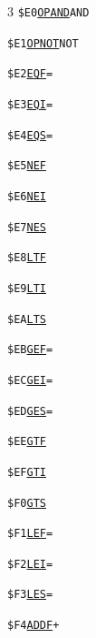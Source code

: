 \begin{multicols}{3}
\noindent\texttt{\$E0}\quad \hyperlink{l:OPAND}{\texttt{OPAND}}\hfill\texttt{AND}\par
\noindent\texttt{\$E1}\quad \hyperlink{l:OPNOT}{\texttt{OPNOT}}\hfill\texttt{NOT}\par
\noindent\texttt{\$E2}\quad \hyperlink{l:EQF}{\texttt{EQF}}\hfill\texttt{=}\par
\noindent\texttt{\$E3}\quad \hyperlink{l:EQI}{\texttt{EQI}}\hfill\texttt{=}\par
\noindent\texttt{\$E4}\quad \hyperlink{l:EQS}{\texttt{EQS}}\hfill\texttt{=}\par
\noindent\texttt{\$E5}\quad \hyperlink{l:NEF}{\texttt{NEF}}\hfill\texttt{{}{}}\par
\noindent\texttt{\$E6}\quad \hyperlink{l:NEI}{\texttt{NEI}}\hfill\texttt{{}{}}\par
\noindent\texttt{\$E7}\quad \hyperlink{l:NES}{\texttt{NES}}\hfill\texttt{{}{}}\par
\noindent\texttt{\$E8}\quad \hyperlink{l:LTF}{\texttt{LTF}}\hfill\texttt{{}}\par
\noindent\texttt{\$E9}\quad \hyperlink{l:LTI}{\texttt{LTI}}\hfill\texttt{{}}\par
\noindent\texttt{\$EA}\quad \hyperlink{l:LTS}{\texttt{LTS}}\hfill\texttt{{}}\par
\noindent\texttt{\$EB}\quad \hyperlink{l:GEF}{\texttt{GEF}}\hfill\texttt{{}=}\par
\noindent\texttt{\$EC}\quad \hyperlink{l:GEI}{\texttt{GEI}}\hfill\texttt{{}=}\par
\noindent\texttt{\$ED}\quad \hyperlink{l:GES}{\texttt{GES}}\hfill\texttt{{}=}\par
\noindent\texttt{\$EE}\quad \hyperlink{l:GTF}{\texttt{GTF}}\hfill\texttt{{}}\par
\noindent\texttt{\$EF}\quad \hyperlink{l:GTI}{\texttt{GTI}}\hfill\texttt{{}}\par
\noindent\texttt{\$F0}\quad \hyperlink{l:GTS}{\texttt{GTS}}\hfill\texttt{{}}\par
\noindent\texttt{\$F1}\quad \hyperlink{l:LEF}{\texttt{LEF}}\hfill\texttt{{}=}\par
\noindent\texttt{\$F2}\quad \hyperlink{l:LEI}{\texttt{LEI}}\hfill\texttt{{}=}\par
\noindent\texttt{\$F3}\quad \hyperlink{l:LES}{\texttt{LES}}\hfill\texttt{{}=}\par
\noindent\texttt{\$F4}\quad \hyperlink{l:ADDF}{\texttt{ADDF}}\hfill\texttt{+}\par

\end{multicols}
